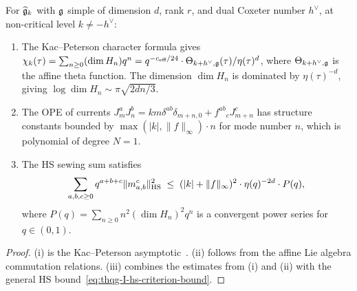 \begin{proposition}
\label{prop:thqg-I-affine-detail}
For $\widehat{\mathfrak{g}}_k$ with $\mathfrak{g}$ simple of dimension $d$, rank $r$, and dual Coxeter number $h^\vee$, at non-critical level $k \neq -h^\vee$:
\begin{enumerate}[label=\textup{(\roman*)}]
\item The Kac--Peterson character formula gives $\chi_k(\tau) = \sum_{n \geq 0} (\dim H_n) q^n = q^{-c_{\text{eff}}/24} \cdot \Theta_{k+h^\vee,\mathfrak{g}}(\tau) / \eta(\tau)^d$, where $\Theta_{k+h^\vee,\mathfrak{g}}$ is the affine theta function. The dimension $\dim H_n$ is dominated by $\eta(\tau)^{-d}$, giving $\log \dim H_n \sim \pi\sqrt{2dn/3}$.
\item The OPE of currents $J^a_m J^b_n = k m \delta^{ab}\delta_{m+n,0} + f^{ab}{}_c J^c_{m+n}$ has structure constants bounded by $\max(|k|, \|f\|_\infty) \cdot n$ for mode number $n$, which is polynomial of degree $N = 1$.
\item The HS sewing sum satisfies
 \begin{equation}\label{eq:thqg-I-affine-hs-refined}
 \sum_{a,b,c \geq 0} q^{a+b+c} \|m^c_{a,b}\|_{\operatorname{HS}}^2 \;\leq\; (|k| + \|f\|_\infty)^2 \cdot \eta(q)^{-2d} \cdot P(q),
 \end{equation}
 where $P(q) = \sum_{n \geq 0} n^2 (\dim H_n)^2 q^n$ is a convergent power series for $q \in (0,1)$.
\end{enumerate}
\end{proposition}

\begin{proof}
(i) is the Kac--Peterson asymptotic~\cite{KP84}. (ii) follows from the affine Lie algebra commutation relations. (iii) combines the estimates from (i) and (ii) with the general HS bound~\eqref{eq:thqg-I-hs-criterion-bound}.
\end{proof}

